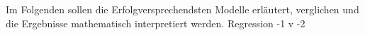 
Im Folgenden sollen die Erfolgversprechendsten Modelle erläutert, verglichen und
die Ergebnisse mathematisch interpretiert werden. Regression -1 v -2



